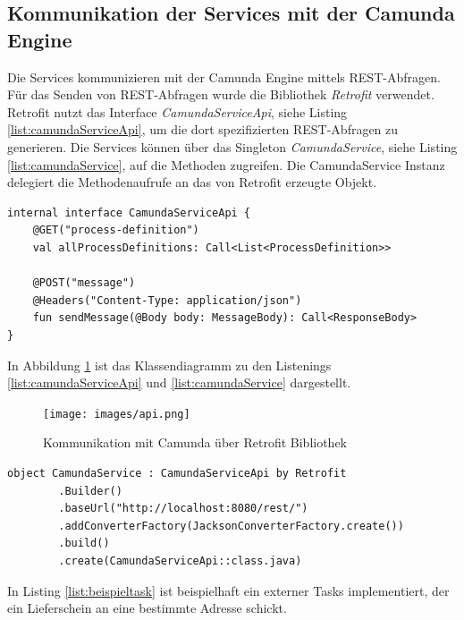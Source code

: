 \subsection{Kommunikation der Services mit der Camunda Engine}

Die Services kommunizieren mit der Camunda Engine mittels REST-Abfragen. Für das Senden von REST-Abfragen wurde die Bibliothek \textit{Retrofit} verwendet. Retrofit nutzt das Interface \textit{CamundaServiceApi}, siehe Listing \ref{list:camundaServiceApi}, um die dort spezifizierten REST-Abfragen zu generieren. Die Services können über das Singleton \textit{CamundaService}, siehe Listing \ref{list:camundaService}, auf die Methoden zugreifen. Die CamundaService Instanz delegiert die Methodenaufrufe an das von Retrofit erzeugte Objekt.

\begin{lstlisting}[caption={CamundaServiceApi},label=list:camundaServiceApi]
internal interface CamundaServiceApi {
    @GET("process-definition")
    val allProcessDefinitions: Call<List<ProcessDefinition>>

    @POST("message")
    @Headers("Content-Type: application/json")
    fun sendMessage(@Body body: MessageBody): Call<ResponseBody>
}
\end{lstlisting}

In Abbildung \ref{fig:api} ist das Klassendiagramm zu den Listenings \ref{list:camundaServiceApi} und \ref{list:camundaService} dargestellt.

\begin{figure}
  \centering
  \texttt{[image: images/api.png]}
  \caption{Kommunikation mit Camunda über Retrofit Bibliothek}
  \label{fig:api}
\end{figure}

\begin{lstlisting}[caption={CamundaService},label=list:camundaService]
object CamundaService : CamundaServiceApi by Retrofit
        .Builder()
        .baseUrl("http://localhost:8080/rest/")
        .addConverterFactory(JacksonConverterFactory.create())
        .build()
        .create(CamundaServiceApi::class.java)
\end{lstlisting}

In Listing \ref{list:beispieltask} ist beispielhaft ein externer Tasks implementiert, der ein Lieferschein an eine bestimmte Adresse schickt.

